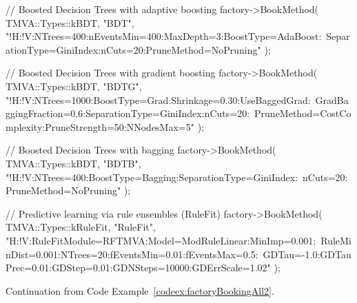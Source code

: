 \begin{appendix}
\begin{codeexample}
\begin{tmvacode}
// Boosted Decision Trees with adaptive boosting 
factory->BookMethod( TMVA::Types::kBDT, "BDT", 
    "!H:!V:NTrees=400:nEventsMin=400:MaxDepth=3:BoostType=AdaBoost:\
     SeparationType=GiniIndex:nCuts=20:PruneMethod=NoPruning" );

// Boosted Decision Trees with gradient boosting 
factory->BookMethod( TMVA::Types::kBDT, "BDTG", 
    "!H:!V:NTrees=1000:BoostType=Grad:Shrinkage=0.30:UseBaggedGrad:\
     GradBaggingFraction=0.6:SeparationType=GiniIndex:nCuts=20:\
     PruneMethod=CostComplexity:PruneStrength=50:NNodesMax=5" );

// Boosted Decision Trees with bagging
factory->BookMethod( TMVA::Types::kBDT, "BDTB", 
    "!H:!V:NTrees=400:BoostType=Bagging:SeparationType=GiniIndex:\
     nCuts=20:PruneMethod=NoPruning" );

// Predictive learning via rule ensembles (RuleFit)
factory->BookMethod( TMVA::Types::kRuleFit, "RuleFit",
    "H:!V:RuleFitModule=RFTMVA:Model=ModRuleLinear:MinImp=0.001:\
     RuleMinDist=0.001:NTrees=20:fEventsMin=0.01:fEventsMax=0.5:\
     GDTau=-1.0:GDTauPrec=0.01:GDStep=0.01:GDNSteps=10000:GDErrScale=1.02" );
\end{tmvacode}
\caption[.]{\codeexampleCaptionSize Continuation from Code Example~\ref{codeex:factoryBookingAll2}.}
\label{codeex:factoryBookingAll3}
\end{codeexample}

\end{appendix}

